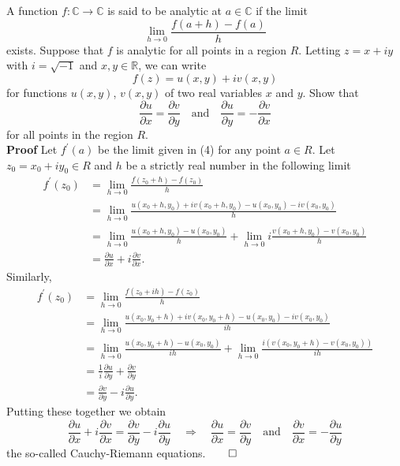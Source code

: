 \documentclass[11pt, letterpaper]{article}
\newcommand{\mbb}[1]{\mathbb{#1}}
\begin{document}
     A function $f:\mbb{C}\rightarrow\mbb{C}$ is said to be analytic at $a\in\mbb{C}$ if the limit
    \[\lim_{h\rightarrow 0}\frac{f(a+h)-f(a)}{h}\tag{4}\]
    exists. Suppose that $f$ is analytic for all points in a region $R$. Letting $z=x+iy$ with $i=\sqrt{-1}$ and $x,y\in\mbb{R}$, we can write
    \[f(z)=u(x,y)+iv(x,y)\]
    for functions $u(x,y)$, $v(x,y)$ of two real variables $x$ and $y$. Show that
    \[\frac{\partial u}{\partial x}=\frac{\partial v}{\partial y}\quad\text{and}\quad\frac{\partial u}{\partial y}=-\frac{\partial v}{\partial x}\]
    for all points in the region $R$.\\[10pt]
    {\bf Proof} Let $f^\prime(a)$ be the limit given in (4) for any point $a\in R$. Let $z_0=x_0+iy_0\in R$ and $h$ be a strictly real number in the following limit
    \begin{align*}
        f^\prime(z_0)&=\lim_{h\rightarrow 0}\frac{f(z_0+h)-f(z_0)}{h}\\
        &=\lim_{h\rightarrow 0}\frac{u(x_0+h,y_0)+iv(x_0+h,y_0)-u(x_0,y_0)-iv(x_0,y_0)}{h}\\
        &=\lim_{h\rightarrow 0}\frac{u(x_0+h,y_0)-u(x_0,y_0)}{h}+\lim_{h\rightarrow 0}i\frac{v(x_0+h,y_0)-v(x_0,y_0)}{h}\\
        &=\frac{\partial u}{\partial x}+i\frac{\partial v}{\partial x}.
    \end{align*}
    Similarly,
    \begin{align*}
        f^\prime(z_0)&=\lim_{h\rightarrow 0}\frac{f(z_0+ih)-f(z_0)}{h}\\
        &=\lim_{h\rightarrow 0}\frac{u(x_0,y_0+h)+iv(x_0,y_0+h)-u(x_0,y_0)-iv(x_0,y_0)}{ih}\\
        &=\lim_{h\rightarrow 0}\frac{u(x_0,y_0+h)-u(x_0,y_0)}{ih}+\lim_{h\rightarrow 0}\frac{i(v(x_0,y_0+h)-v(x_0,y_0))}{ih}\\
        &=\frac{1}{i}\frac{\partial u}{\partial y}+\frac{\partial v}{\partial y}\\
        &=\frac{\partial v}{\partial y}-i\frac{\partial u}{\partial y}.
    \end{align*}
    Putting these together we obtain
    \[\frac{\partial u}{\partial x}+i\frac{\partial v}{\partial x}=\frac{\partial v}{\partial y}-i\frac{\partial u}{\partial y}\quad\Rightarrow\quad \frac{\partial u}{\partial x}=\frac{\partial v}{\partial y}\quad\text{and}\quad\frac{\partial v}{\partial x}=-\frac{\partial u}{\partial y}\tag{5}\]
    the so-called Cauchy-Riemann equations.\hfill{$\qed$}\\[10pt]
\end{document}
